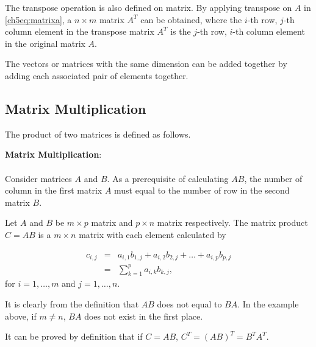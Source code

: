 The transpose operation is also defined on matrix. By applying transpose on $A$ in \eqref{ch5eq:matrixa}, a $n\times m$ matrix $A^T$ can be obtained, where the $i$-th row, $j$-th column element in the transpose matrix $A^T$ is the $j$-th row, $i$-th column element in the original matrix $A$.

The vectors or matrices with the same dimension can be added together by adding each associated pair of elements together.

\subsection{Matrix Multiplication}

The product of two matrices is defined as follows. 

\begin{VF}
\textbf{Matrix Multiplication}:
\\
\\
Consider matrices $A$ and $B$. As a prerequisite of calculating $AB$, the number of column in the first matrix $A$ must equal to the number of row in the second matrix $B$. 

Let $A$ and $B$ be $m\times p$ matrix and $p\times n$ matrix respectively. The matrix product $C=AB$ is a $m \times n$ matrix with each element calculated by

\begin{eqnarray}
    c_{i,j} &=& a_{i,1}b_{1,j} + a_{i,2}b_{2,j} + \ldots + a_{i,p}b_{p,j} \nonumber \\
    &=& \sum_{k=1}^p a_{i,k}b_{k,j}, \nonumber
\end{eqnarray}
for $i = 1, \ldots, m$ and $j= 1, \ldots, n$.

It is clearly from the definition that $AB$ does not equal to $BA$. In the example above, if $m\neq n$, $BA$ does not exist in the first place.
\end{VF}

It can be proved by definition that if $C=AB$, $C^T = (AB)^T = B^TA^T$.


